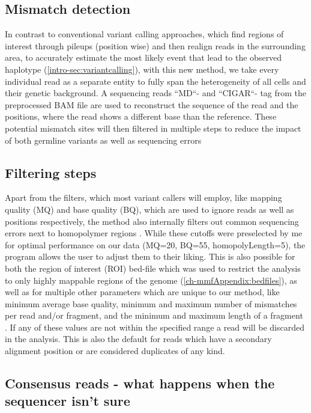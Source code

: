 \subsection{Mismatch detection}
In contrast to conventional variant calling approaches, which find regions of interest through pileups (position wise) and then realign reads in the surrounding area, to accurately estimate the most likely event that lead to the observed haplotype (\autoref{intro-sec:variantcalling}), with this new method, we take every individual read as a separate entity to fully span the heterogeneity of all cells and their genetic background. A sequencing reads ``MD``- and ``CIGAR``- tag from the preprocessed BAM file are used to reconstruct the sequence of the read and the positions, where the read shows a different base than the reference. These potential mismatch sites will then filtered in multiple steps to reduce the impact of both germline variants as well as sequencing errors

\subsection{Filtering steps}
Apart from the filters, which most variant callers will employ, like mapping quality (MQ) and base quality (BQ), which are used to ignore reads as well as positions respectively, the method also internally filters out common sequencing errors next to homopolymer regions \cite{Heydari2019}. While these cutoffs were preselected by me for optimal performance on our data (MQ=20, BQ=55, homopolyLength=5), the program allows the user to adjust them to their liking.
This is also possible for both the region of interest (ROI) bed-file which was used to restrict the analysis to only highly mappable regions of the genome (\autoref{ch-mmfAppendix:bedfiles}), as well as for multiple other parameters which are unique to our method, like minimum average base quality, minimum and maximum number of mismatches per read and/or fragment, and the minimum and maximum length of a fragment \cite{Hudecova2021} . If any of these values are not within the specified range a read will be discarded in the analysis. This is also the default for reads which have a secondary alignment position or are considered duplicates of any kind.

\subsection[Consensus reads]{Consensus reads - what happens when the sequencer isn't sure}
\label{mmf-sec:consensus}

